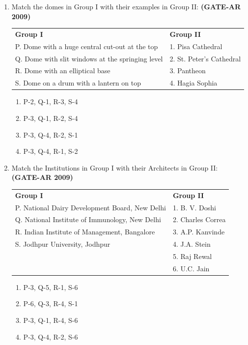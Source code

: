 \documentclass[a4paper,10pt]{article}
\begin{document}
\begin{enumerate}
    \item Match the domes in Group I with their examples in Group II: \hfill \textbf{(GATE-AR 2009)} \\
    \begin{tabular}{ l l }
	\textbf{Group I} & \textbf{Group II} \\
	P. Dome with a huge central cut-out at the top & 1. Pisa Cathedral \\
	Q. Dome with slit windows at the springing level & 2. St. Peter’s Cathedral \\
	R. Dome with an elliptical base & 3. Pantheon \\
	S. Dome on a drum with a lantern on top & 4. Hagia Sophia \\
	\end{tabular}
	\begin{multicols}{2}
	\begin{enumerate}
        \item P-2, Q-1, R-3, S-4
        \item P-3, Q-1, R-2, S-4
        \item P-3, Q-4, R-2, S-1
        \item P-3, Q-4, R-1, S-2
    \end{enumerate}
	\end{multicols}

    \item Match the Institutions in Group I with their Architects in Group II: \hfill \textbf{(GATE-AR 2009)} \\
    \begin{tabular}{ l l }
	\textbf{Group I} & \textbf{Group II} \\
	P. National Dairy Development Board, New Delhi & 1. B. V. Doshi \\
	Q. National Institute of Immunology, New Delhi & 2. Charles Correa \\
	R. Indian Institute of Management, Bangalore & 3. A.P. Kanvinde \\
	S. Jodhpur University, Jodhpur & 4. J.A. Stein \\
	& 5. Raj Rewal \\
	& 6. U.C. Jain \\
	\end{tabular}
	\begin{multicols}{2}
	\begin{enumerate}
        \item P-3, Q-5, R-1, S-6
        \item P-6, Q-3, R-4, S-1
        \item P-3, Q-1, R-4, S-6
        \item P-3, Q-4, R-2, S-6
    \end{enumerate}
	\end{multicols}


\end{enumerate}
\end{document}
